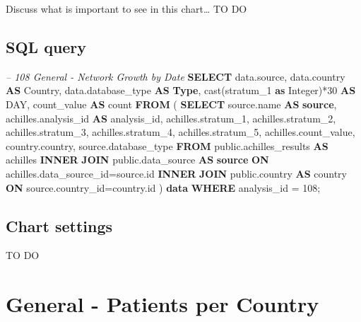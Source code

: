 \documentclass[]{book}
\newenvironment{Shaded}{\begin{snugshade}}{\end{snugshade}}
\newcommand{\KeywordTok}[1]{\textcolor[rgb]{0.13,0.29,0.53}{\textbf{#1}}}
\newcommand{\DataTypeTok}[1]{\textcolor[rgb]{0.13,0.29,0.53}{#1}}
\newcommand{\DecValTok}[1]{\textcolor[rgb]{0.00,0.00,0.81}{#1}}
\newcommand{\CommentTok}[1]{\textcolor[rgb]{0.56,0.35,0.01}{\textit{#1}}}
\newcommand{\FunctionTok}[1]{\textcolor[rgb]{0.00,0.00,0.00}{#1}}
\newcommand{\NormalTok}[1]{#1}
\begin{document}
Discuss what is important to see in this chart\ldots{} TO DO

\subsection{SQL query}\label{sql-query-4}

\begin{Shaded}
\begin{Highlighting}[]
\CommentTok{-- 108    General - Network Growth by Date}
\KeywordTok{SELECT}\NormalTok{ data.source,}
\NormalTok{       data.country }\KeywordTok{AS}\NormalTok{ Country,}
\NormalTok{       data.database_type }\KeywordTok{AS} \KeywordTok{Type}\NormalTok{,}
       \FunctionTok{cast}\NormalTok{(stratum_1 }\KeywordTok{as} \DataTypeTok{Integer}\NormalTok{)*}\DecValTok{30} \KeywordTok{AS} \DataTypeTok{DAY}\NormalTok{,}
\NormalTok{       count_value                   }\KeywordTok{AS} \FunctionTok{count}
\KeywordTok{FROM}\NormalTok{ (}
     \KeywordTok{SELECT}\NormalTok{ source.name              }\KeywordTok{AS} \KeywordTok{source}\NormalTok{,}
\NormalTok{            achilles.analysis_id     }\KeywordTok{AS}\NormalTok{ analysis_id,}
\NormalTok{            achilles.stratum_1,}
\NormalTok{            achilles.stratum_2,}
\NormalTok{            achilles.stratum_3,}
\NormalTok{            achilles.stratum_4,}
\NormalTok{            achilles.stratum_5,}
\NormalTok{            achilles.count_value,}
\NormalTok{            country.country,}
\NormalTok{            source.database_type}
     \KeywordTok{FROM}\NormalTok{ public.achilles_results }\KeywordTok{AS}\NormalTok{ achilles }\KeywordTok{INNER} \KeywordTok{JOIN} 
\NormalTok{        public.data_source }\KeywordTok{AS} \KeywordTok{source} \KeywordTok{ON} 
\NormalTok{        achilles.data_source_id=source.id}
     \KeywordTok{INNER} \KeywordTok{JOIN}\NormalTok{ public.country }\KeywordTok{AS}\NormalTok{ country }\KeywordTok{ON} 
\NormalTok{        source.country_id=country.id}
\NormalTok{     ) }\KeywordTok{data}
\KeywordTok{WHERE}\NormalTok{ analysis_id = }\DecValTok{108}\NormalTok{;}
\end{Highlighting}
\end{Shaded}

\subsection{Chart settings}\label{chart-settings-4}

TO DO

\section{General - Patients per
Country}\label{general---patients-per-country}
\end{document}
